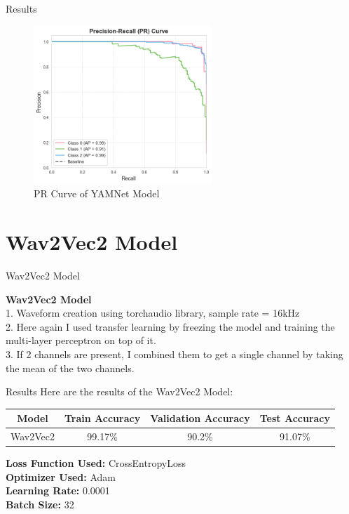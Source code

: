 \documentclass{beamer}
\begin{document}
\begin{frame}{Results}
    
    \begin{figure}
        \centering
        \includegraphics[width=0.6\textwidth]{yamnet4.png}
        \caption{PR Curve of YAMNet Model}
    \end{figure}

\end{frame}

\section*{Wav2Vec2 Model}
\begin{frame}{Wav2Vec2 Model}

    \textbf{Wav2Vec2 Model} \\
    1. Waveform creation using torchaudio library, sample rate = 16kHz \\
    2. Here again I used transfer learning by freezing the model and training the multi-layer perceptron on top of it. \\
    3. If 2 channels are present, I combined them to get a single channel by taking the mean of the two channels. \\
    
\end{frame}

\begin{frame}{Results}
    Here are the results of the Wav2Vec2 Model:
    \begin{table}[h]
        \centering
        \begin{tabular}{|c|c|c|c|}
            \hline
            \textbf{Model} & \textbf{Train Accuracy} & \textbf{Validation Accuracy} & \textbf{Test Accuracy} \\
            \hline
            Wav2Vec2 & 99.17\% & 90.2\% & 91.07\% \\
            \hline
        \end{tabular}
    \end{table}

    \textbf{Loss Function Used:} CrossEntropyLoss \\
    \textbf{Optimizer Used:} Adam \\
    \textbf{Learning Rate:} 0.0001 \\
    \textbf{Batch Size:} 32 \\

\end{frame}
\end{document}
